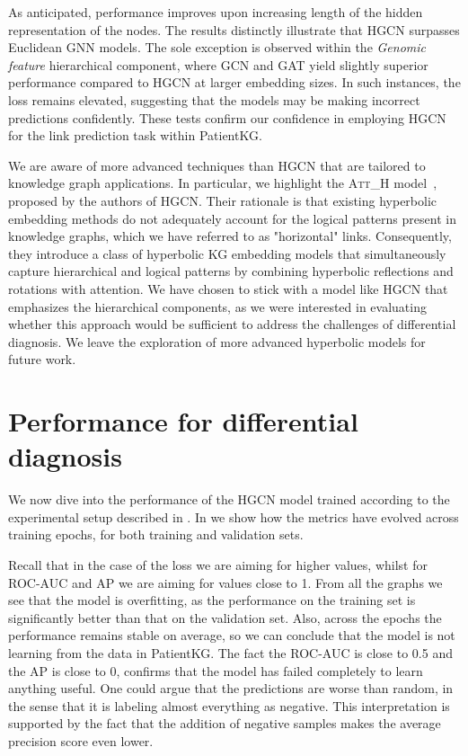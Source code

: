 As anticipated, performance improves upon increasing length of the hidden representation of the nodes. The results distinctly illustrate that HGCN surpasses Euclidean GNN models. The sole exception is observed within the \emph{Genomic feature} hierarchical component, where GCN and GAT yield slightly superior performance compared to HGCN at larger embedding sizes. In such instances, the loss remains elevated, suggesting that the models may be making incorrect predictions confidently. These tests confirm our confidence in employing HGCN for the link prediction task within PatientKG.


We are aware of more advanced techniques than HGCN that are tailored to knowledge graph applications. In particular, we highlight the \textsc{Att\_H} model~\cite{chami2020lowDimensionalHyperbolicKnowledgeGraphEmbeddings}, proposed by the authors of HGCN. Their rationale is that existing hyperbolic embedding methods do not adequately account for the logical patterns present in knowledge graphs, which we have referred to as "horizontal" links. Consequently, they introduce a class of hyperbolic KG embedding models that simultaneously capture hierarchical and logical patterns by combining hyperbolic reflections and rotations with attention. We have chosen to stick with a model like HGCN that emphasizes the hierarchical components, as we were interested in evaluating whether this approach would be sufficient to address the challenges of differential diagnosis. We leave the exploration of more advanced hyperbolic models for future work.



\section{Performance for differential diagnosis}

We now dive into the performance of the HGCN model trained according to the experimental setup described in . In  we show how the metrics have evolved across training epochs, for both training and validation sets. 

Recall that in the case of the loss we are aiming for higher values, whilst for ROC-AUC and AP we are aiming for values close to 1. From all the graphs we see that the model is overfitting, as the performance on the training set is significantly better than that on the validation set. Also, across the epochs the performance remains stable on average, so we can conclude that the model is not learning from the data in PatientKG. The fact the ROC-AUC is close to 0.5 and the AP is close to 0, confirms that the model has failed completely to learn anything useful. One could argue that the predictions are worse than random, in the sense that it is labeling almost everything as negative. This interpretation is supported by the fact that the addition of negative samples makes the average precision score even lower. 

